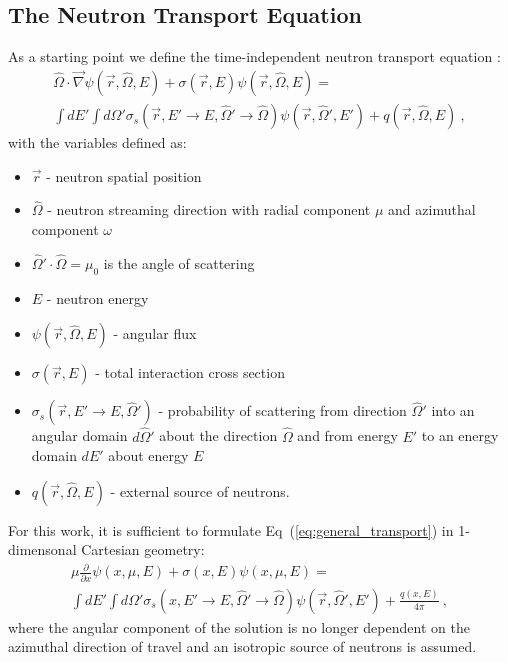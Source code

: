 \documentclass[letterpaper,12pt]{article}
\begin{document}
\subsection{The Neutron Transport Equation}
\label{subsec:transport_eq}
As a starting point we define the time-independent neutron transport
equation \cite{lewis_computational_1993}:
\begin{multline}
  \hat{\Omega} \cdot \vec{\nabla} \psi(\vec{r},\hat{\Omega},E) +
  \sigma(\vec{r},E) \psi(\vec{r},\hat{\Omega},E) = \\ \int dE' \int
  d\Omega' \sigma_s(\vec{r},E' \rightarrow E,\hat{\Omega}' \rightarrow
  \hat{\Omega}) \psi(\vec{r},\hat{\Omega}',E') +
  q(\vec{r},\hat{\Omega},E)\:,
  \label{eq:general_transport}
\end{multline}
with the variables defined as:
\begin{itemize}
\item $\vec{r}$ - neutron spatial position
\item $\hat{\Omega}$ - neutron streaming direction with radial
  component $\mu$ and azimuthal component $\omega$
\item $\hat{\Omega}' \cdot \hat{\Omega} = \mu_0$ is the angle of
  scattering
\item $E$ - neutron energy
\item $\psi(\vec{r},\hat{\Omega},E)$ - angular flux
\item $\sigma(\vec{r},E)$ - total interaction cross section
\item $\sigma_s(\vec{r},E' \rightarrow E,\hat{\Omega}')$ - probability
  of scattering from direction $\hat{\Omega}'$ into an angular domain
  $d\hat{\Omega}'$ about the direction $\hat{\Omega}$ and from energy
  $E'$ to an energy domain $dE'$ about energy $E$
\item $q(\vec{r},\hat{\Omega},E)$ - external source of neutrons.
\end{itemize}
For this work, it is sufficient to formulate
Eq~(\ref{eq:general_transport}) in 1-dimensonal Cartesian geometry:
\begin{multline}
  \mu \frac{\partial}{\partial x} \psi(x,\mu,E) + \sigma(x,E)
  \psi(x,\mu,E) = \\ \int dE' \int d\Omega' \sigma_s(x,E' \rightarrow
  E,\hat{\Omega}' \rightarrow \hat{\Omega})
  \psi(\vec{r},\hat{\Omega}',E') + \frac{q(x,E)}{4 \pi}\:,
  \label{eq:cart_1d_transport}
\end{multline}
where the angular component of the solution is no longer dependent on
the azimuthal direction of travel and an isotropic source of neutrons
is assumed.
\end{document}
